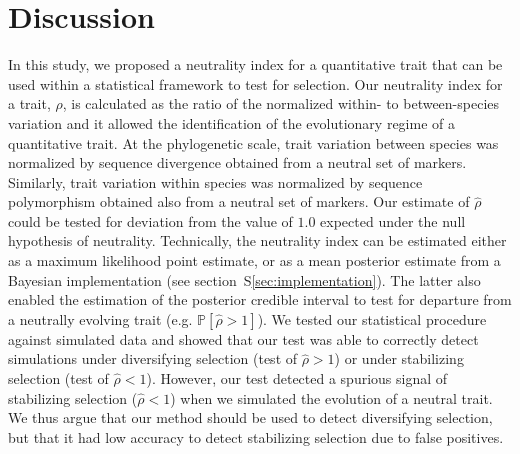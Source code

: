 \documentclass{article}
\newcommand{\proba}{\mathbb{P}}
\newcommand{\NI}{\rho}
\newcommand{\EstNI}{\widehat{\rho}}
\begin{document}
\section*{Discussion}\label{sec:discussion}

In this study, we proposed a neutrality index for a quantitative trait that can be used within a statistical framework to test for selection.
Our neutrality index for a trait, $\NI$, is calculated as the ratio of the normalized within- to between-species variation and it allowed the identification of the evolutionary regime of a quantitative trait.
At the phylogenetic scale, trait variation between species was normalized by sequence divergence obtained from a neutral set of markers.
Similarly, trait variation within species was normalized by sequence polymorphism obtained also from a neutral set of markers.
Our estimate of $\EstNI$ could be tested for deviation from the value of $1.0$ expected under the null hypothesis of neutrality.
Technically, the neutrality index can be estimated either as a maximum likelihood point estimate, or as a mean posterior estimate from a Bayesian implementation (see section~S\ref{sec:implementation}).
The latter also enabled the estimation of the posterior credible interval to test for departure from a neutrally evolving trait (e.g. $ \proba [ \EstNI > 1 ]$).
We tested our statistical procedure against simulated data and showed that our test was able to correctly detect simulations under diversifying selection (test of $\EstNI > 1$) or under stabilizing selection (test of $\EstNI < 1$).
However, our test detected a spurious signal of stabilizing selection ($\EstNI < 1$) when we simulated the evolution of a neutral trait.
We thus argue that our method should be used to detect diversifying selection, but that it had low accuracy to detect stabilizing selection due to false positives.
\end{document}

